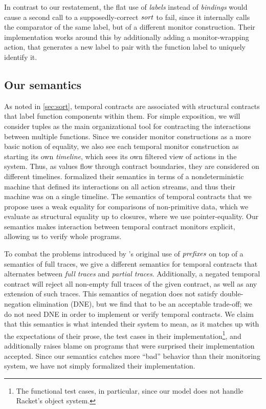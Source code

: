 In contrast to our restatement, the flat use of \emph{labels} instead of \emph{bindings} would cause a second call to a supposedly-correct $\mathit{sort}$ to fail, since it internally calls the comparator of the same label, but of a different monitor construction.
%
Their implementation works around this by additionally adding a monitor-wrapping action, that generates a new label to pair with the function label to uniquely identify it.

\subsection{Our semantics}
%
As noted in \autoref{sec:sort}, temporal contracts are associated with structural contracts that label function components within them.
%
For simple exposition, we will consider tuples as the main organizational tool for contracting the interactions between multiple functions.
%
Since we consider monitor constructions as a more basic notion of equality, we also see each temporal monitor construction as starting its own \emph{timeline}, which sees its own filtered view of actions in the system.
%
Thus, as values flow through contract boundaries, they are considered on different timelines.
%
\dfm{} formalized their semantics in terms of a nondeterministic machine that defined its interactions on all action streams, and thus their machine was on a single timeline.
%
The semantics of temporal contracts that we propose uses a weak equality for comparisons of non-primitive data, which we evaluate as structural equality up to closures, where we use pointer-equality.
%
Our semantics makes interaction between temporal contract monitors explicit, allowing us to verify whole programs.

%
To combat the problems introduced by \dfm's original use of $\mathit{prefixes}$ on top of a semantics of full traces, we give a different semantics for temporal contracts that alternates between \emph{full traces} and \emph{partial traces}.
%
Additionally, a negated temporal contract will reject all non-empty full traces of the given contract, as well as any extension of such traces.
%
This semantics of negation does not satisfy double-negation elimination (DNE), but we find that to be an acceptable trade-off; we do not need DNE in order to implement or verify temporal contracts.
%
We claim that this semantics is what \dfm{} intended their system to mean, as it matches up with the expectations of their prose, the test cases in their implementation\footnote{The functional test cases, in particular, since our model does not handle Racket's object system.}, and additionally raises blame on programs that \dfm{} were surprised their implementation accepted.
%
Since our semantics catches more ``bad'' behavior than their monitoring system, we have not simply formalized their implementation.

